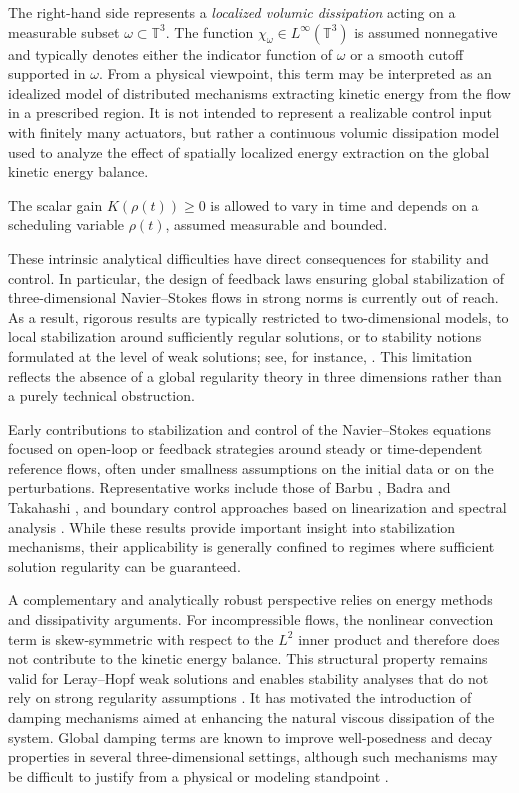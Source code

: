 \documentclass[preprint,12pt]{elsarticle}
\begin{document}
The right-hand side represents a \emph{localized volumic dissipation} acting on
a measurable subset $\omega\subset\mathbb{T}^3$.
The function $\chi_\omega\in L^\infty(\mathbb{T}^3)$ is assumed nonnegative and
typically denotes either the indicator function of $\omega$ or a smooth cutoff
supported in $\omega$.
From a physical viewpoint, this term may be interpreted as an idealized model of
distributed mechanisms extracting kinetic energy from the flow in a prescribed
region.
It is not intended to represent a realizable control input with finitely many
actuators, but rather a continuous volumic dissipation model used to analyze
the effect of spatially localized energy extraction on the global kinetic
energy balance.

The scalar gain $K(\rho(t))\ge 0$ is allowed to vary in time and depends on a
scheduling variable $\rho(t)$, assumed measurable and bounded.

\medskip

These intrinsic analytical difficulties have direct consequences for stability
and control.
In particular, the design of feedback laws ensuring global stabilization of
three-dimensional Navier--Stokes flows in strong norms is currently out of reach.
As a result, rigorous results are typically restricted to two-dimensional
models, to local stabilization around sufficiently regular solutions, or to
stability notions formulated at the level of weak solutions; see, for instance,
\cite{Barbu2003,BadraTakahashi2009a,BadraTakahashi2009b,Raymond2006}.
This limitation reflects the absence of a global regularity theory in three
dimensions rather than a purely technical obstruction.

Early contributions to stabilization and control of the Navier--Stokes equations
focused on open-loop or feedback strategies around steady or time-dependent
reference flows, often under smallness assumptions on the initial data or on the
perturbations.
Representative works include those of Barbu \cite{Barbu2003}, Badra and Takahashi
\cite{BadraTakahashi2009a}, and boundary control approaches based on linearization
and spectral analysis \cite{Raymond2006}.
While these results provide important insight into stabilization mechanisms,
their applicability is generally confined to regimes where sufficient solution
regularity can be guaranteed.

A complementary and analytically robust perspective relies on energy methods and
dissipativity arguments.
For incompressible flows, the nonlinear convection term is skew-symmetric with
respect to the $L^2$ inner product and therefore does not contribute to the
kinetic energy balance.
This structural property remains valid for Leray--Hopf weak solutions and enables
stability analyses that do not rely on strong regularity assumptions
\cite{TemamNS2001,FoiasTemamTurbulence2001}.
It has motivated the introduction of damping mechanisms aimed at enhancing the
natural viscous dissipation of the system.
Global damping terms are known to improve well-posedness and decay properties in
several three-dimensional settings, although such mechanisms may be difficult to
justify from a physical or modeling standpoint
\cite{cai2008weak,zhou2012regularity,vasseur2016global,raugel1993navier}.
\end{document}
